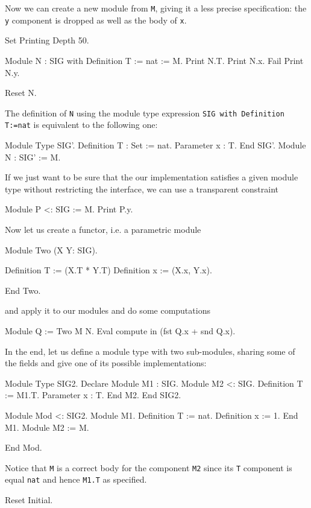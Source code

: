 Now we can create a new module from \texttt{M}, giving it a less
precise specification: the \texttt{y} component is dropped as well
as the body of \texttt{x}.

\begin{coq_eval}
Set Printing Depth 50.
\end{coq_eval}
\begin{coq_example}
Module N  :  SIG with Definition T := nat  :=  M.
Print N.T.
Print N.x.
Fail Print N.y.
\end{coq_example}
\begin{coq_eval}
Reset N.
\end{coq_eval}

\noindent
The definition of \texttt{N} using the module type expression
\texttt{SIG with Definition T:=nat} is equivalent to the following
one:

\begin{coq_example*}
Module Type SIG'.
  Definition T : Set := nat.
  Parameter x : T.
End SIG'.
Module N : SIG' := M.
\end{coq_example*}
If we just want to be sure that the our implementation satisfies a
given module type without restricting the interface, we can use a
transparent constraint
\begin{coq_example}
Module P <: SIG := M.
Print P.y.
\end{coq_example}
Now let us create a functor, i.e. a parametric module
\begin{coq_example}
Module Two (X Y: SIG).
\end{coq_example}
\begin{coq_example*}
  Definition T := (X.T * Y.T)%
  Definition x := (X.x, Y.x).
\end{coq_example*}
\begin{coq_example}
End Two.
\end{coq_example}
and apply it to our modules and do some computations
\begin{coq_example}
Module Q := Two M N.
Eval compute in (fst Q.x + snd Q.x).
\end{coq_example}
In the end, let us define a module type with two sub-modules, sharing
some of the fields and give one of its possible implementations:
\begin{coq_example}
Module Type SIG2.
  Declare Module M1 : SIG.
  Module M2 <: SIG.
    Definition T := M1.T.
    Parameter x : T.
  End M2.
End SIG2.
\end{coq_example}
\begin{coq_example*}
Module Mod <: SIG2.
  Module M1.
    Definition T := nat.
    Definition x := 1.
  End M1.
  Module M2 := M.
\end{coq_example*}
\begin{coq_example}
End Mod.
\end{coq_example}
Notice that \texttt{M} is a correct body for the component \texttt{M2}
since its \texttt{T} component is equal \texttt{nat} and hence
\texttt{M1.T} as specified.
\begin{coq_eval}
Reset Initial.
\end{coq_eval}

